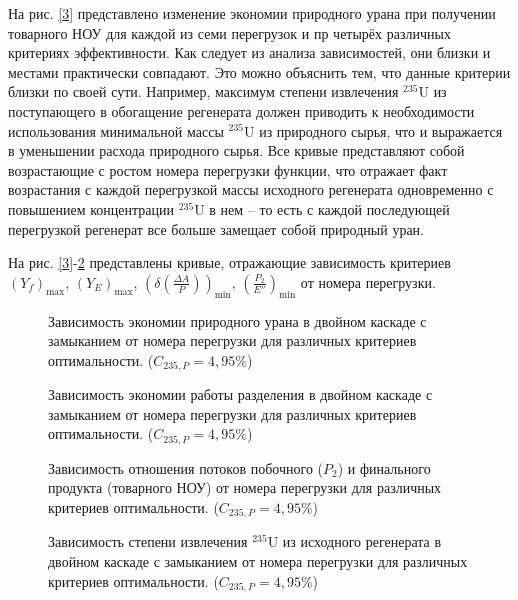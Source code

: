 На рис. \ref{3} представлено изменение экономии природного урана при получении товарного НОУ для каждой из семи перегрузок и пр четырёх различных критериях эффективности. Как следует из анализа зависимостей, они близки и местами практически совпадают. Это можно объяснить тем, что данные критерии близки по своей сути. Например, максимум степени извлечения $^{235}$U из поступающего в обогащение регенерата должен приводить к необходимости использования минимальной массы $^{235}$U из природного сырья, что и выражается в уменьшении расхода природного сырья. Все кривые представляют собой возрастающие с ростом номера перегрузки функции, что отражает факт возрастания с каждой перегрузкой массы исходного регенерата одновременно с повышением концентрации $^{235}$U в нем -- то есть с каждой последующей перегрузкой регенерат все больше замещает собой природный уран.

На рис. \ref{3}-\ref{4} представлены кривые, отражающие зависимость критериев $(Y_f)_\text{max}$, $(Y_{E})_\text{max}$, $(\delta(\frac{\Delta A}{P}))_\text{min}$, $(\frac{P_2}{E''})_\text{min}$ от номера перегрузки.

\begin{figure}[ht]
    \centering
    \begin{minipage}{.5\textwidth}
      \centering
      
      \caption{{Зависимость экономии природного урана в двойном каскаде с замыканием от номера перегрузки для различных критериев оптимальности. ($C_{235,{P}}=4,95\%$){\label{3}}}}
    \end{minipage}%
    \begin{minipage}{.5\textwidth}
        \centering
        
  \caption{{Зависимость экономии работы разделения в двойном каскаде с замыканием от номера перегрузки для различных критериев оптимальности. ($C_{235,{P}}=4,95\%$){\label{6}}}}
  \end{minipage}
\end{figure}

\begin{figure}[ht]
    \centering
    \begin{minipage}{.51\textwidth}
      \centering
      
      \caption{{Зависимость отношения потоков побочного ($P_2$) и финального продукта (товарного НОУ) от  номера перегрузки для различных критериев оптимальности. ($C_{235,{P}}=4,95\%$){\label{5}}}}
    \end{minipage}%
    \begin{minipage}{.5\textwidth}
        \centering
        
    \caption{{Зависимость степени извлечения $^{235}$U из исходного регенерата в двойном каскаде с замыканием от номера перегрузки для различных критериев оптимальности. ($C_{235,{P}}=4,95\%$){\label{4}}}}
    \end{minipage}
\end{figure}

